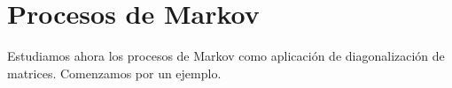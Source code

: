 %
%
%







\section{Procesos de Markov}

Estudiamos ahora los procesos de Markov como aplicación de diagonalización de matrices. Comenzamos por un ejemplo.



